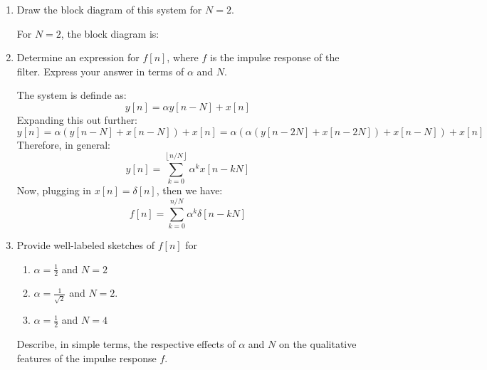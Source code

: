 \documentclass[10pt]{article}
\begin{document}
	\begin{enumerate}[label=\alph*)]
		\item Draw the block diagram of this system for \( N = 2 \). 
			
			\begin{solution}
				For \( N = 2 \), the block diagram is: 
				\begin{center}
				\end{center}
			\end{solution}
		\item Determine an expression for \( f[n] \), where \( f \) is the impulse response of the filter. Express
			your answer in terms of \( \alpha \) and \( N \). 
			\begin{solution}
				The system is definde as:
				\[
					y[n] = \alpha y[n - N] + x[n]
				\] 
				Expanding this out further:
				\[
					y[n] = \alpha(y[n - N] + x[n - N]) + x[n] = \alpha(\alpha (y[n -2N] + x[n - 2N]) + x[n - N]) + 
					x[n]
				\] 
				Therefore, in general:
				\[
					y[n] = \sum_{k = 0}^{\left\lfloor n/N \right\rfloor} \alpha^{k} x[n - kN]
				\] 
				Now, plugging in \( x[n] = \delta[n] \), then we have:
				\[
					f[n] = \sum_{k = 0}^{n / N}\alpha ^{k}\delta[n - kN]
				\] 
			\end{solution}
		\item Provide well-labeled sketches of \( f[n] \) for 
			\begin{enumerate}[label=\roman*)]
				\item \( \alpha = \frac{1}{2} \) and \( N = 2 \) 
				\item \( \alpha = \frac{1}{\sqrt{2} } \) and \( N = 2 \). 
				\item \( \alpha = \frac{1}{2} \) and \( N = 4 \)
			\end{enumerate}
			Describe, in simple terms, the respective effects of \( \alpha \) and \( N \) on the qualitative features 
			of the impulse response \( f \). 


\end{enumerate}
\end{document}
